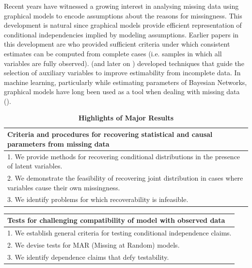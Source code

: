 \documentclass[12pt]{article}
\begin{document}
Recent years have witnessed
a growing interest in analysing missing data  %
using graphical models to encode
assumptions about the reasons for missingness.
This development is natural since graphical models
provide efficient representation of conditional independencies implied by modeling assumptions.  %
Earlier papers in this development are \cite{daniel2012using} who provided sufficient criteria under which consistent estimates can be computed from complete cases (i.e. samples in which all variables are fully observed).%
\cite{felix2013} (and later on \cite{felix2015}) developed techniques that guide the selection of auxiliary variables to improve estimability from incomplete data.
In machine learning, particularly while estimating
parameters of Bayesian Networks, graphical models have long been used as a tool when dealing with missing data (\cite{darwiche2009modeling}). 

\begin{table}[t]
	\centering
		\caption{\textbf{Highlights of Major Results}}
		\newlength\q
\setlength{}
\noindent
	\begin{tabular}{p{\q}}%
	\toprule
		\textbf{Criteria and procedures for recovering statistical and causal parameters from missing data}
	\\
	\midrule
		1. We provide methods for recovering conditional distributions in the presence of latent variables.\\
		2. We demonstrate the feasibility of recovering joint distribution in cases where variables cause their own missingness.\\
		3. We identify problems for which recoverability is infeasible.\\
					\hline
	\end{tabular}
	\label{tab:highlights1}
\end{table}

\begin{table}[t]
	\centering
		\newlength\qo
\setlength{}
\noindent
	\begin{tabular}{p{\qo}}%
	\toprule
		\textbf{Tests for challenging compatibility of model with observed data}
	\\
	\midrule
		1. We establish general criteria for testing conditional independence claims.\\
		2. We devise tests for MAR (Missing at Random) models.\\
		3. We identify dependence claims that defy testability.\\
					\hline
	\end{tabular}
	\label{tab:highlights2}
\end{table}
\end{document}
